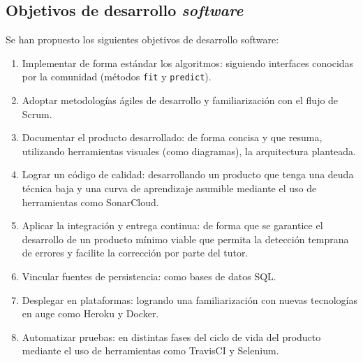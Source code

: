 \subsection{Objetivos de desarrollo \textit{software}}
\label{Objetivos de desarrollo}

Se han propuesto los siguientes objetivos de desarrollo software:

\begin{enumerate}
	\item Implementar de forma estándar los algoritmos: siguiendo interfaces conocidas por la comunidad (métodos \texttt{fit} y \texttt{predict}).
	\item Adoptar metodologías ágiles de desarrollo y familiarización con el flujo de Scrum.
	\item Documentar el producto desarrollado: de forma concisa y que resuma, utilizando herramientas visuales (como diagramas), la arquitectura planteada.
	\item Lograr un código de calidad: desarrollando un producto que tenga una deuda técnica baja y una curva de aprendizaje asumible mediante el uso de herramientas como SonarCloud.
	\item Aplicar la integración y entrega continua: de forma que se garantice el desarrollo de un producto mínimo viable que permita la detección temprana de errores y facilite la corrección por parte del tutor.
	\item Vincular fuentes de persistencia: como bases de datos SQL.
	\item Desplegar en plataformas: logrando una familiarización con nuevas tecnologías en auge como Heroku y Docker.
	\item Automatizar pruebas: en distintas fases del ciclo de vida del producto mediante el uso de herramientas como TravisCI y Selenium.
	
\end{enumerate}